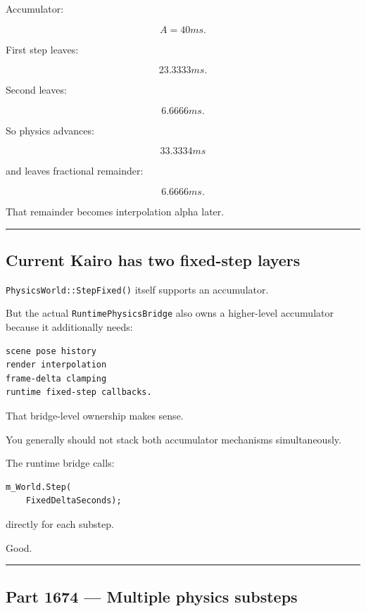 Accumulator:

\[
A=40ms.
\]

First step leaves:

\[
23.3333ms.
\]

Second leaves:

\[
6.6666ms.
\]

So physics advances:

\[
33.3334ms
\]

and leaves fractional remainder:

\[
6.6666ms.
\]

That remainder becomes interpolation alpha later.

\begin{center}\rule{0.5\linewidth}{0.5pt}\end{center}

\subsection{Current Kairo has two fixed-step layers}\label{06-engine-ii-ch037-current-kairo-has-two-fixed-step-layers}

\hypertarget{06-engine-ii-ch037-current-kairo-has-two-fixed-step-layers}{}

\texttt{PhysicsWorld::StepFixed()} itself supports an accumulator.

But the actual \texttt{RuntimePhysicsBridge} also owns a higher-level accumulator because it additionally needs:

\begin{verbatim}
scene pose history
render interpolation
frame-delta clamping
runtime fixed-step callbacks.
\end{verbatim}

That bridge-level ownership makes sense.

You generally should not stack both accumulator mechanisms simultaneously.

The runtime bridge calls:

\begin{verbatim}
m_World.Step(
    FixedDeltaSeconds);
\end{verbatim}

directly for each substep.

Good.

\begin{center}\rule{0.5\linewidth}{0.5pt}\end{center}

\subsection{Part 1674 --- Multiple physics substeps}\label{06-engine-ii-ch037-part-1674-multiple-physics-substeps}

